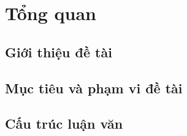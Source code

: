 \chapter{Tổng quan}
\section{Giới thiệu đề tài}
\section{Mục tiêu và phạm vi đề tài}
\section{Cấu trúc luận văn}